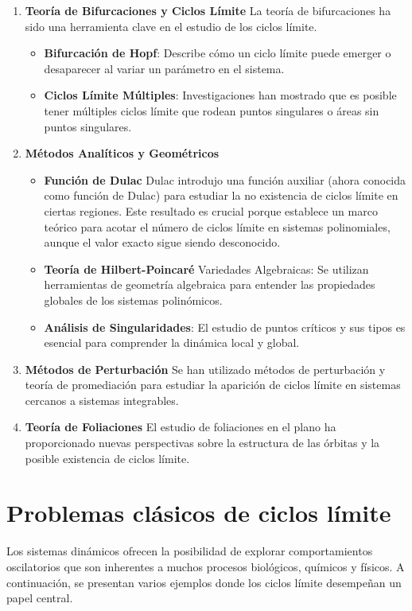 \begin{enumerate}
	\item \textbf{Teoría de Bifurcaciones y Ciclos Límite}
	La teoría de bifurcaciones ha sido una herramienta clave en el estudio de los ciclos límite.
	\begin{itemize}
		\item \textbf{Bifurcación de Hopf}: Describe cómo un ciclo límite puede emerger o desaparecer al variar un parámetro en el sistema.
		\item \textbf{Ciclos Límite Múltiples}: Investigaciones han mostrado que es posible tener múltiples ciclos límite que rodean puntos singulares o áreas sin puntos singulares.
	\end{itemize}
	\item \textbf{Métodos Analíticos y Geométricos}
	\begin{itemize}
		\item \textbf{Función de Dulac}
		Dulac introdujo una función auxiliar (ahora conocida como función de Dulac) para estudiar la no existencia de ciclos límite en ciertas regiones. Este resultado es crucial porque establece un marco teórico para acotar el número de ciclos límite en sistemas polinomiales, aunque el valor exacto sigue siendo desconocido.
		\item \textbf{Teoría de Hilbert-Poincaré}
		Variedades Algebraicas: Se utilizan herramientas de geometría algebraica para entender las propiedades globales de los sistemas polinómicos.
		
		\item \textbf{Análisis de Singularidades}: El estudio de puntos críticos y sus tipos es esencial para comprender la dinámica local y global.
	\end{itemize}

	\item \textbf{Métodos de Perturbación}
	Se han utilizado métodos de perturbación y teoría de promediación para estudiar la aparición de ciclos límite en sistemas cercanos a sistemas integrables.
	\item \textbf{Teoría de Foliaciones}
	El estudio de foliaciones en el plano ha proporcionado nuevas perspectivas sobre la estructura de las órbitas y la posible existencia de ciclos límite.
\end{enumerate}

\section{Problemas clásicos de ciclos límite}

Los sistemas dinámicos ofrecen la posibilidad de explorar comportamientos oscilatorios que son inherentes a muchos procesos biológicos, químicos y físicos. A continuación, se presentan varios ejemplos donde los ciclos límite desempeñan un papel central.

